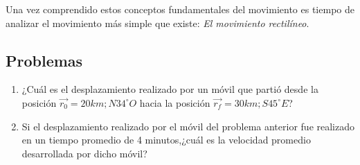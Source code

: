 Una vez comprendido estos conceptos fundamentales del movimiento es tiempo de analizar el movimiento más simple que existe: 
\textit{El movimiento rectilíneo}.

\subsection*{Problemas}

\begin{enumerate}
 \item ¿Cuál es el desplazamiento realizado por un móvil que partió desde la posición $\vec{r_0} = 20 km;N34^\circ O$ hacia la 
posición $\vec{r_f} = 30 km; S45^\circ E$? 

\item Si el desplazamiento realizado por el móvil del problema anterior fue realizado en un tiempo promedio de 4 minutos,¿cuál es 
la velocidad promedio desarrollada por dicho móvil?

\end{enumerate}
